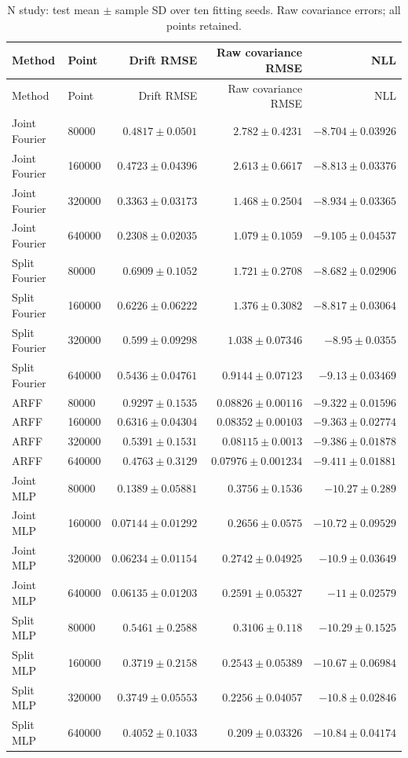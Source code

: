 \begin{longtable}{llrrr}\caption{N study: test mean $\pm$ sample SD over ten fitting seeds. Raw covariance errors; all points retained.}\\\toprule Method & Point & Drift RMSE & Raw covariance RMSE & NLL\\\midrule\endfirsthead\toprule Method & Point & Drift RMSE & Raw covariance RMSE & NLL\\\midrule\endhead
Joint Fourier & 80000 & $0.4817\pm 0.0501$ & $2.782\pm 0.4231$ & $-8.704\pm 0.03926$\\
Joint Fourier & 160000 & $0.4723\pm 0.04396$ & $2.613\pm 0.6617$ & $-8.813\pm 0.03376$\\
Joint Fourier & 320000 & $0.3363\pm 0.03173$ & $1.468\pm 0.2504$ & $-8.934\pm 0.03365$\\
Joint Fourier & 640000 & $0.2308\pm 0.02035$ & $1.079\pm 0.1059$ & $-9.105\pm 0.04537$\\
Split Fourier & 80000 & $0.6909\pm 0.1052$ & $1.721\pm 0.2708$ & $-8.682\pm 0.02906$\\
Split Fourier & 160000 & $0.6226\pm 0.06222$ & $1.376\pm 0.3082$ & $-8.817\pm 0.03064$\\
Split Fourier & 320000 & $0.599\pm 0.09298$ & $1.038\pm 0.07346$ & $-8.95\pm 0.0355$\\
Split Fourier & 640000 & $0.5436\pm 0.04761$ & $0.9144\pm 0.07123$ & $-9.13\pm 0.03469$\\
ARFF & 80000 & $0.9297\pm 0.1535$ & $0.08826\pm 0.00116$ & $-9.322\pm 0.01596$\\
ARFF & 160000 & $0.6316\pm 0.04304$ & $0.08352\pm 0.00103$ & $-9.363\pm 0.02774$\\
ARFF & 320000 & $0.5391\pm 0.1531$ & $0.08115\pm 0.0013$ & $-9.386\pm 0.01878$\\
ARFF & 640000 & $0.4763\pm 0.3129$ & $0.07976\pm 0.001234$ & $-9.411\pm 0.01881$\\
Joint MLP & 80000 & $0.1389\pm 0.05881$ & $0.3756\pm 0.1536$ & $-10.27\pm 0.289$\\
Joint MLP & 160000 & $0.07144\pm 0.01292$ & $0.2656\pm 0.0575$ & $-10.72\pm 0.09529$\\
Joint MLP & 320000 & $0.06234\pm 0.01154$ & $0.2742\pm 0.04925$ & $-10.9\pm 0.03649$\\
Joint MLP & 640000 & $0.06135\pm 0.01203$ & $0.2591\pm 0.05327$ & $-11\pm 0.02579$\\
Split MLP & 80000 & $0.5461\pm 0.2588$ & $0.3106\pm 0.118$ & $-10.29\pm 0.1525$\\
Split MLP & 160000 & $0.3719\pm 0.2158$ & $0.2543\pm 0.05389$ & $-10.67\pm 0.06984$\\
Split MLP & 320000 & $0.3749\pm 0.05553$ & $0.2256\pm 0.04057$ & $-10.8\pm 0.02846$\\
Split MLP & 640000 & $0.4052\pm 0.1033$ & $0.209\pm 0.03326$ & $-10.84\pm 0.04174$\\
\bottomrule\end{longtable}

